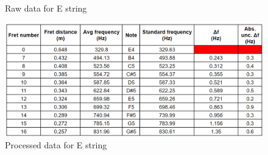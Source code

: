 \begin{appendices}
\begin{figure}[!htbp]
            \caption{Raw data for E string}
        \end{figure}
        \begin{figure}[!htbp]
            \includegraphics[width = \textwidth]{ee/e string prsd.png}
            \caption{Processed data for E string}
        \end{figure}
\end{appendices}
